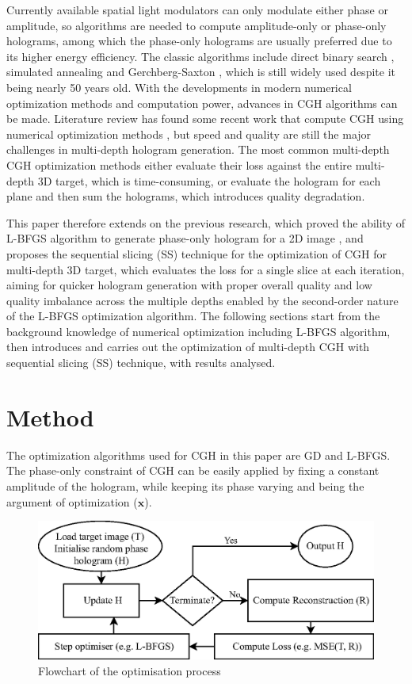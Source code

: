 Currently available spatial light modulators can only modulate either phase or amplitude, so algorithms are needed to compute amplitude-only or phase-only holograms, among which the phase-only holograms are usually preferred due to its higher energy efficiency. The classic algorithms include direct binary search \cite{Seldowitz1987}, simulated annealing \cite{Kirkpatrick1983} and Gerchberg-Saxton \cite{Gerchberg1972}, which is still widely used despite it being nearly 50 years old. With the developments in modern numerical optimization methods and computation power, advances in CGH algorithms can be made. Literature review has found some recent work that compute CGH using numerical optimization methods \cite{Zhang2017, Liu2020, Choi2021, Chen2021, Kadis2022}, but speed and quality are still the major challenges in multi-depth hologram generation. The most common multi-depth CGH optimization methods either evaluate their loss against the entire multi-depth 3D target, which is time-consuming, or evaluate the hologram for each plane and then sum the holograms, which introduces quality degradation.

This paper therefore extends on the previous research, which proved the ability of L-BFGS algorithm to generate phase-only hologram for a 2D image \cite{Sha2022}, and proposes the sequential slicing (SS) technique for the optimization of CGH for multi-depth 3D target, which evaluates the loss for a single slice at each iteration, aiming for quicker hologram generation with proper overall quality and low quality imbalance across the multiple depths enabled by the second-order nature of the L-BFGS optimization algorithm. The following sections start from the background knowledge of numerical optimization including L-BFGS algorithm, then introduces and carries out the optimization of multi-depth CGH with sequential slicing (SS) technique, with results analysed.



\section{Method}



The optimization algorithms used for CGH in this paper are GD and L-BFGS. The phase-only constraint of CGH can be easily applied by fixing a constant amplitude of the hologram, while keeping its phase varying and being the argument of optimization ($\textbf{x}$).

\begin{figure}[H]
	\centering
	\includegraphics[width=\textwidth]{optim_flowchart_2D.eps}
	\caption{Flowchart of the optimisation process}
	\label{fig:optim_flowchart_2D}
\end{figure}




